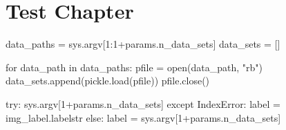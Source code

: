 \chapter{Test Chapter}\label{ch:test_chapter} 

\begin{pythoncode} %
data_paths = sys.argv[1:1+params.n_data_sets]
data_sets = []

for data_path in data_paths:
    pfile = open(data_path, "rb")
    data_sets.append(pickle.load(pfile))
    pfile.close()

try:
    sys.argv[1+params.n_data_sets]
except IndexError:
    label = img_label.labelstr
else:
    label = sys.argv[1+params.n_data_sets]
\end{pythoncode}




